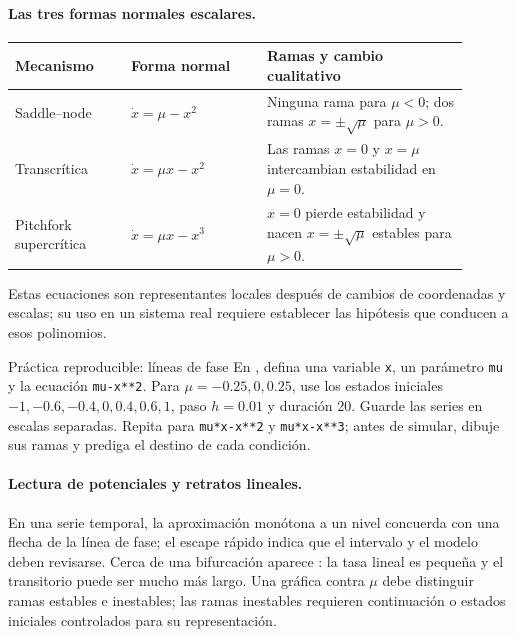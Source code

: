 \paragraph{Las tres formas normales escalares.}
\begin{longtable}{>{\raggedright\arraybackslash}p{0.23\linewidth}
                  >{\raggedright\arraybackslash}p{0.27\linewidth}
                  >{\raggedright\arraybackslash}p{0.40\linewidth}}
\toprule
Mecanismo & Forma normal & Ramas y cambio cualitativo \\
\midrule
\endhead
Saddle--node & \(\dot x=\mu-x^2\) &
Ninguna rama para \(\mu<0\); dos ramas \(x=\pm\sqrt\mu\) para \(\mu>0\).\\
Transcrítica & \(\dot x=\mu x-x^2\) &
Las ramas \(x=0\) y \(x=\mu\) intercambian estabilidad en \(\mu=0\).\\
Pitchfork supercrítica & \(\dot x=\mu x-x^3\) &
\(x=0\) pierde estabilidad y nacen \(x=\pm\sqrt\mu\) estables para \(\mu>0\).\\
\bottomrule
\end{longtable}
Estas ecuaciones son representantes locales después de cambios de coordenadas y
escalas; su uso en un sistema real requiere establecer las hipótesis que conducen a esos polinomios.

\begin{activitybox}{Práctica reproducible: líneas de fase}
En , defina una variable \texttt{x}, un parámetro
\texttt{mu} y la ecuación \texttt{mu-x**2}. Para
\(\mu=-0.25,0,0.25\), use los estados iniciales
\(-1,-0.6,-0.4,0,0.4,0.6,1\), paso \(h=0.01\) y duración \(20\).
Guarde las series en escalas separadas. Repita para
\texttt{mu*x-x**2} y \texttt{mu*x-x**3}; antes de simular, dibuje sus ramas y
prediga el destino de cada condición.
\end{activitybox}

\paragraph{Lectura de potenciales y retratos lineales.}
En una serie temporal, la aproximación monótona a un nivel concuerda con una flecha
de la línea de fase; el escape rápido indica que el intervalo y el modelo deben
revisarse. Cerca de una bifurcación aparece : la tasa
lineal es pequeña y el transitorio puede ser mucho más largo. Una gráfica contra
\(\mu\) debe distinguir ramas estables e inestables; las ramas inestables requieren
continuación o estados iniciales controlados para su representación.

